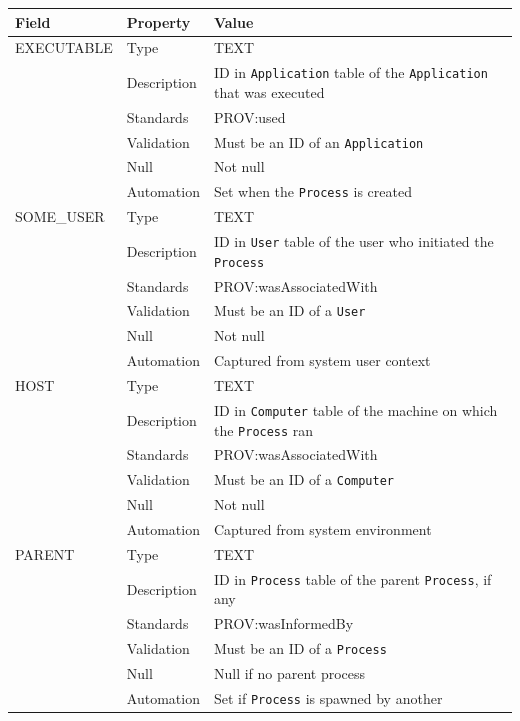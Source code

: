 \documentclass[
]{article}
\newcounter{none} %
\begin{document}
{\def\LTcaptype{none} %
\begin{longtable}[]{@{}
  >{\raggedright\arraybackslash}p{}
  >{\raggedright\arraybackslash}p{}
  >{\raggedright\arraybackslash}p{}@{}}
\toprule\noalign{}
\begin{minipage}[b]{\linewidth}\raggedright
Field
\end{minipage} & \begin{minipage}[b]{\linewidth}\raggedright
Property
\end{minipage} & \begin{minipage}[b]{\linewidth}\raggedright
Value
\end{minipage} \\
\midrule\noalign{}
\endhead
\bottomrule\noalign{}
\endlastfoot
EXECUTABLE & Type & TEXT \\
& Description & ID in \texttt{Application} table of the
\texttt{Application} that was executed \\
& Standards & PROV:used \\
& Validation & Must be an ID of an \texttt{Application} \\
& Null & Not null \\
& Automation & Set when the \texttt{Process} is created \\
SOME\_USER & Type & TEXT \\
& Description & ID in \texttt{User} table of the user who initiated the
\texttt{Process} \\
& Standards & PROV:wasAssociatedWith \\
& Validation & Must be an ID of a \texttt{User} \\
& Null & Not null \\
& Automation & Captured from system user context \\
HOST & Type & TEXT \\
& Description & ID in \texttt{Computer} table of the machine on which
the \texttt{Process} ran \\
& Standards & PROV:wasAssociatedWith \\
& Validation & Must be an ID of a \texttt{Computer} \\
& Null & Not null \\
& Automation & Captured from system environment \\
PARENT & Type & TEXT \\
& Description & ID in \texttt{Process} table of the parent
\texttt{Process}, if any \\
& Standards & PROV:wasInformedBy \\
& Validation & Must be an ID of a \texttt{Process} \\
& Null & Null if no parent process \\
& Automation & Set if \texttt{Process} is spawned by another \\
\end{longtable}
}
\end{document}
